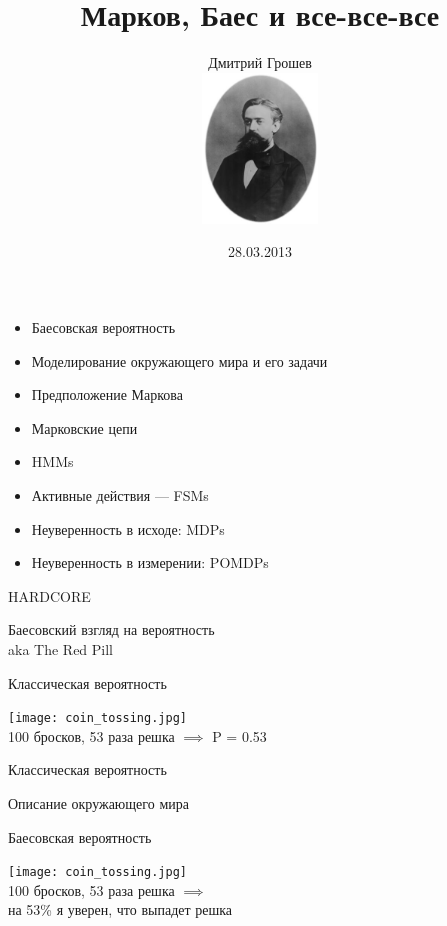 \documentclass[10pt]{beamer}
\title[Markov Stuff]{Марков, Баес и все-все-все}
\author{Дмитрий Грошев\\
  \includegraphics[height=4cm]{markov.jpg}}
\date{28.03.2013}
\institute{СПбГУ}
\begin{document}
\renewcommand*{\inserttotalframenumber}{\pageref{lastframe}}
\begin{frame}
\titlepage
\end{frame}


\begin{frame}
  \begin{itemize}
  \item Баесовская вероятность
  \item Моделирование окружающего мира и его задачи
  \item Предположение Маркова
  \item Марковские цепи
  \item HMMs
  \item Активные действия — FSMs
  \item Неуверенность в исходе: MDPs
  \item Неуверенность в измерении: POMDPs
  \end{itemize}
  \begin{center}
    HARDCORE
  \end{center}
\end{frame}

\begin{frame}
  \begin{center}
    \Large
    Баесовский взгляд на вероятность\\ aka The Red Pill
  \end{center}
\end{frame}

\begin{frame}{Классическая вероятность}
  \begin{center}
    \texttt{[image: coin\_tossing.jpg]}\\
    100 бросков, 53 раза решка $\implies$ P = 0.53
  \end{center}
\end{frame}

\begin{frame}{Классическая вероятность}
  \begin{center}
    \Large
    Описание окружающего мира
  \end{center}
\end{frame}

\begin{frame}{Баесовская вероятность}
  \begin{center}
  \texttt{[image: coin\_tossing.jpg]}\\
  100 бросков, 53 раза решка $\implies$ \\
  на 53\% я уверен, что выпадет решка
  \end{center}
\end{frame}
\end{document}
